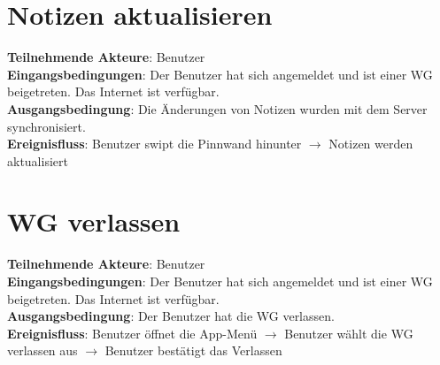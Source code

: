 \documentclass[a4paper]{scrreprt}
\begin{document}
		\section{Notizen aktualisieren}
		\textbf{Teilnehmende Akteure}: Benutzer \\
		\textbf{Eingangsbedingungen}: Der Benutzer hat sich angemeldet und ist einer WG beigetreten. Das Internet ist verfügbar. \\
		\textbf{Ausgangsbedingung}: Die Änderungen von Notizen wurden mit dem Server synchronisiert. \\
		\textbf{Ereignisfluss}: Benutzer swipt die Pinnwand hinunter $\rightarrow$ Notizen werden aktualisiert
		
		\section{WG verlassen}
		\textbf{Teilnehmende Akteure}: Benutzer \\
		\textbf{Eingangsbedingungen}: Der Benutzer hat sich angemeldet und ist einer WG beigetreten. Das Internet ist verfügbar. \\
		\textbf{Ausgangsbedingung}: Der Benutzer hat die WG verlassen. \\
		\textbf{Ereignisfluss}: Benutzer öffnet die App-Menü $\rightarrow$ Benutzer wählt die WG verlassen aus $\rightarrow$ Benutzer bestätigt das Verlassen
\end{document}
